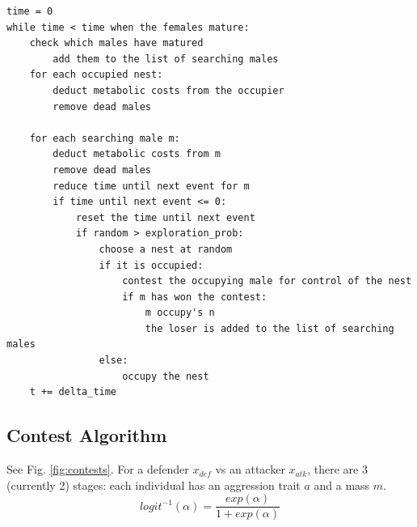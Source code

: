 \documentclass[a4paper,11pt]{article}
\begin{document}
\begin{verbatim}
time = 0
while time < time when the females mature:
    check which males have matured
        add them to the list of searching males
    for each occupied nest:
        deduct metabolic costs from the occupier
        remove dead males

    for each searching male m:
        deduct metabolic costs from m
        remove dead males
        reduce time until next event for m
        if time until next event <= 0:
            reset the time until next event
            if random > exploration_prob:
                choose a nest at random
                if it is occupied:
                    contest the occupying male for control of the nest
                    if m has won the contest:
                        m occupy's n
                        the loser is added to the list of searching males
                else:
                    occupy the nest
    t += delta_time
\end{verbatim}


\clearpage
\subsection{Contest Algorithm}
See Fig. \ref{fig:contests}.
For a defender $x_{def}$ vs an attacker $x_{atk}$, there are 3 (currently 2) stages:
each individual has an aggression trait $a$ and a mass $m$.
\begin{equation}\label{eq:logit}
    logit^{-1}(\alpha) = \frac{exp(\alpha)}{1 + exp(\alpha)}
\end{equation}
\end{document}

